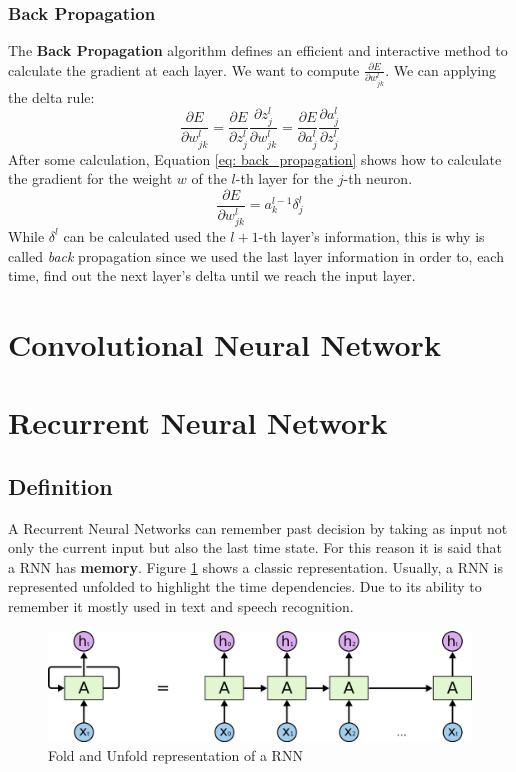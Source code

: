 \documentclass[11pt]{article}
\begin{document}
\subsubsection{Back Propagation}
The \textbf{Back Propagation} algorithm defines an efficient and interactive method to calculate the gradient at each layer. We want to compute $\frac{\partial E}{\partial w^l_{jk}}$. We can applying the delta rule: 
\begin{equation}
\frac{\partial E}{\partial w^l_{jk}} = \frac{\partial E}{\partial z^l_j}\frac{\partial z^l_j}{\partial w^l_{jk}} =	
\frac{\partial E}{\partial a^l_j}\frac{\partial a^l_j}{\partial z^l_{j}}
\end{equation}
After some calculation, Equation \ref{eq: back_propagation} shows how to calculate the gradient for the weight $w$ of the $l$-th layer for the $j$-th neuron.
\begin{equation}
\frac{\partial E}{\partial w^l_{jk}} = a^{l-1}_k \delta^l_j
\label{eq: back_propagation}
\end{equation}  
While $\delta^l$ can be calculated used the $l+1$-th layer's information, this is why is called \emph{back} propagation since we used the last layer information in order to, each time, find out the next layer's delta until we reach the input layer.
\section{Convolutional Neural Network}
\section{Recurrent Neural Network}
\subsection{Definition}
A Recurrent Neural Networks can remember past decision by taking as input not only the current input but also the last time state. For this reason it is said that a RNN has \textbf{memory}. Figure \ref{fig: RNN} shows a classic representation. Usually, a RNN is represented unfolded to highlight the time dependencies. Due to its ability to remember it mostly used in text and speech recognition.
\begin{figure}[h]
\centering
\includegraphics[scale=0.4]{images/rnn}	
\caption{Fold and Unfold representation of a RNN}
\label{fig: RNN}
\end{figure}
\end{document}
